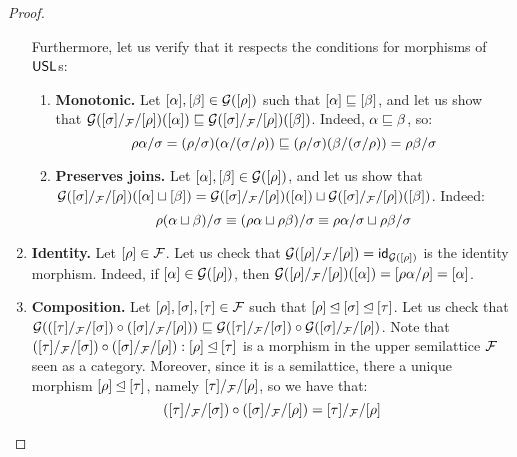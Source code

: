 \begin{proof}
\begin{enumerate}
  Furthermore, let us verify that it respects the conditions for morphisms of $\mathsf{USL}$s:
  \begin{enumerate}
  \item {\bf Monotonic.}
    Let ${[\alpha]}, {[\beta]} \in \mathcal{G}([\rho])$
    such that ${[\alpha]} \sqsubseteq {[\beta]}$, and let us show that
    $\mathcal{G}({[\sigma]}/_{\mathcal{F}}/{[\rho]})({[\alpha]}) \sqsubseteq \mathcal{G}([\sigma]/_{\mathcal{F}}/[\rho])({[\beta]})$.
    Indeed, $\alpha \sqsubseteq \beta$, so:
    \[
      \rho\alpha/\sigma
      = (\rho/\sigma)(\alpha/(\sigma/\rho))
      \sqsubseteq (\rho/\sigma)(\beta/(\sigma/\rho))
      = \rho\beta/\sigma
    \]
  \item {\bf Preserves joins.}
    Let ${[\alpha]}, {[\beta]} \in \mathcal{G}({[\rho]})$,
    and let us show that
    $\mathcal{G}({[\sigma]}/_{\mathcal{F}}/{[\rho]})({[\alpha]} \sqcup {[\beta]}) =
     \mathcal{G}({[\sigma]}/_{\mathcal{F}}/{[\rho]})({[\alpha]}) \sqcup
     \mathcal{G}({[\sigma]}/_{\mathcal{F}}/{[\rho]})({[\beta]})$.
    Indeed:
    \[
      \rho(\alpha \sqcup \beta)/\sigma
      \equiv
      (\rho\alpha \sqcup \rho\beta)/\sigma
      \equiv
      \rho\alpha/\sigma \sqcup \rho\beta/\sigma
    \]
  \end{enumerate}
\item {\bf Identity.}
  Let ${[\rho]} \in \mathcal{F}$.
  Let us check that $\mathcal{G}({[\rho]}/_{\mathcal{F}}/{[\rho]}) = \mathsf{id}_{\mathcal{G}({[\rho]})}$
  is the identity morphism.
  Indeed, if ${[\alpha]} \in \mathcal{G}({[\rho]})$,
  then $\mathcal{G}({[\rho]}/_{\mathcal{F}}/{[\rho]})({[\alpha]}) = {[\rho\alpha/\rho]} = {[\alpha]}$.
\item {\bf Composition.}
  Let ${[\rho]}, {[\sigma]}, {[\tau]} \in \mathcal{F}$
  such that ${[\rho]} \unlhd {[\sigma]} \unlhd {[\tau]}$.
  Let us check that
  $\mathcal{G}(({[\tau]}/_{\mathcal{F}}/{[\sigma]}) \circ ({[\sigma]}/_{\mathcal{F}}/{[\rho]})) \sqsubseteq
   \mathcal{G}({[\tau]}/_{\mathcal{F}}/{[\sigma]}) \circ \mathcal{G}({[\sigma]}/_{\mathcal{F}}/{[\rho]})$.
  Note that
  $({[\tau]}/_{\mathcal{F}}/{[\sigma]}) \circ ({[\sigma]}/_{\mathcal{F}}/{[\rho]}) : {[\rho]} \unlhd {[\tau]}$
  is a morphism in the upper semilattice $\mathcal{F}$ seen as a category.
  Moreover, since it is a semilattice, there a unique morphism ${[\rho]} \unlhd {[\tau]}$,
  namely ${[\tau]}/_{\mathcal{F}}/{[\rho]}$, so we have that:
  \[
    ({[\tau]}/_{\mathcal{F}}/{[\sigma]}) \circ ({[\sigma]}/_{\mathcal{F}}/{[\rho]}) = {[\tau]}/_{\mathcal{F}}/{[\rho]}
\]
\end{enumerate}
\end{proof}
